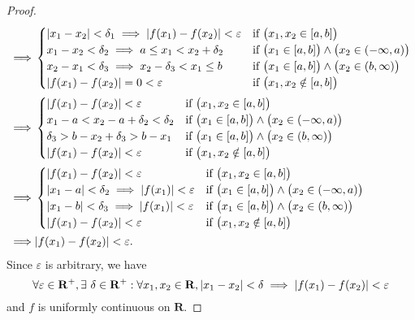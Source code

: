 \begin{proof}
\begin{align*}
        \implies & \begin{cases}
                       \abs*{x_1 - x_2} < \delta_1 \implies \abs*{f(x_1) - f(x_2)} < \varepsilon & \text{if } \big(x_1, x_2 \in [a, b]\big)                                 \\
                       x_1 - x_2 < \delta_2 \implies a \leq x_1 < x_2 + \delta_2                 & \text{if } \big(x_1 \in [a, b]\big) \land \big(x_2 \in (-\infty, a)\big) \\
                       x_2 - x_1 < \delta_3 \implies x_2 - \delta_3 < x_1 \leq b                 & \text{if } \big(x_1 \in [a, b]\big) \land \big(x_2 \in (b, \infty)\big)  \\
                       \abs*{f(x_1) - f(x_2)} = 0 < \varepsilon                                  & \text{if } \big(x_1, x_2 \notin [a, b]\big)
                   \end{cases} \\
        \implies & \begin{cases}
                       \abs*{f(x_1) - f(x_2)} < \varepsilon    & \text{if } \big(x_1, x_2 \in [a, b]\big)                                 \\
                       x_1 - a < x_2 - a + \delta_2 < \delta_2 & \text{if } \big(x_1 \in [a, b]\big) \land \big(x_2 \in (-\infty, a)\big) \\
                       \delta_3 > b - x_2 + \delta_3 > b - x_1 & \text{if } \big(x_1 \in [a, b]\big) \land \big(x_2 \in (b, \infty)\big)  \\
                       \abs*{f(x_1) - f(x_2)} < \varepsilon    & \text{if } \big(x_1, x_2 \notin [a, b]\big)
                   \end{cases}                                   \\
        \implies & \begin{cases}
                       \abs*{f(x_1) - f(x_2)} < \varepsilon                           & \text{if } \big(x_1, x_2 \in [a, b]\big)                                 \\
                       \abs*{x_1 - a} < \delta_2 \implies \abs*{f(x_1)} < \varepsilon & \text{if } \big(x_1 \in [a, b]\big) \land \big(x_2 \in (-\infty, a)\big) \\
                       \abs*{x_1 - b} < \delta_3 \implies \abs*{f(x_1)} < \varepsilon & \text{if } \big(x_1 \in [a, b]\big) \land \big(x_2 \in (b, \infty)\big)  \\
                       \abs*{f(x_1) - f(x_2)} < \varepsilon                           & \text{if } \big(x_1, x_2 \notin [a, b]\big)
                   \end{cases}            \\
        \implies & \abs*{f(x_1) - f(x_2)} < \varepsilon.
    \end{align*}
    Since \(\varepsilon\) is arbitrary, we have
    \[
        \forall \varepsilon \in \mathbf{R}^+, \exists\ \delta \in \mathbf{R}^+ : \forall x_1, x_2 \in \mathbf{R}, \abs*{x_1 - x_2} < \delta \implies \abs*{f(x_1) - f(x_2)} < \varepsilon
    \]
    and \(f\) is uniformly continuous on \(\mathbf{R}\).
\end{proof}

